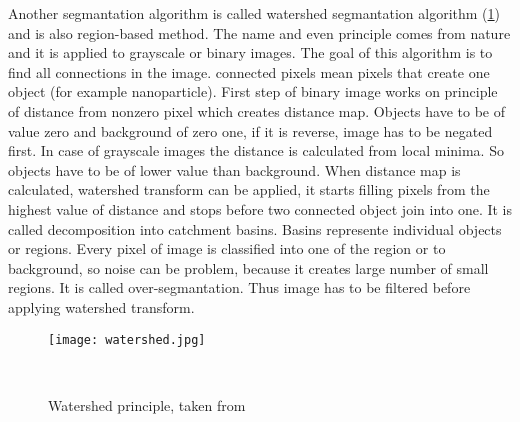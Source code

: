         Another segmantation algorithm is called watershed segmantation algorithm (\ref{fig:watershed}) and is also region-based method. The name and even principle comes from nature and it is applied
        to grayscale or binary images. The goal of this algorithm is to find all connections in the image. connected pixels mean pixels that create one object (for example nanoparticle).
        First step of binary image works on principle of distance from nonzero pixel which creates distance map. Objects have to be of value zero and background of zero one,
        if it is reverse, image has to be negated first. In case of grayscale images the distance is calculated from local minima. So objects have to be of lower value than background.
        When distance map is calculated, watershed transform can be applied, it starts filling pixels from the highest value of distance and stops before two connected object join into one.
        It is called decomposition into catchment basins. Basins represente individual objects or regions. Every pixel of image is classified into one of the region or to background,
        so noise can be problem, because it creates large number of small regions. It is called over-segmantation. Thus image has to be filtered before applying watershed transform.~\cite{2, 3}
        
        \begin{figure}[h]
            \texttt{[image: watershed.jpg]}
            \caption{Watershed principle, taken from~\cite{20}}~\label{fig:watershed}
        \end{figure}

